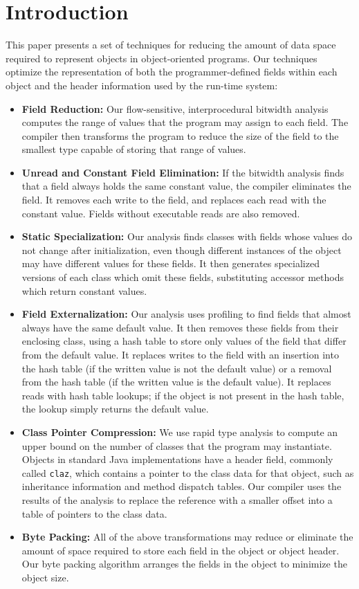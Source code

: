 \documentclass{sig-alt-full}
\begin{document}
\section{Introduction}
%
This paper presents a set of techniques for reducing the
amount of data space required to represent objects
in object-oriented programs. Our techniques optimize
the representation of both the programmer-defined fields
within each object and the header information used by the
run-time system:
\begin{itemize}
\item {\bf Field Reduction:} 
Our flow-sensitive, interprocedural bitwidth analysis
computes the range of values that the program
may assign to each field. The compiler then transforms the program
to reduce the size of the field to the smallest type
capable of storing that range of values. 
\item {\bf Unread and Constant Field Elimination:} 
If the bitwidth analysis finds that a field always holds
the same constant value, the compiler eliminates the field. 
It removes each write to the field, and replaces each read
with the constant value.  Fields without executable reads are
also removed.
\item {\bf Static Specialization:} Our analysis finds 
classes with fields whose values do not change after initialization,
even though different instances of the object may
have different values for these fields. It then generates 
specialized versions of each class which omit these fields,
substituting accessor methods which return constant values.
\item {\bf Field Externalization:} Our analysis uses profiling
to find fields that almost always have the same default value. 
It then removes these fields from their enclosing class, 
using a hash table to store only values of the field that differ
from the default value. It replaces writes to the field with
an insertion into the hash table (if the written value is not the
default value) or a removal from the hash table (if the written value
is the default value). It replaces reads with hash table lookups; 
if the object is not present in the hash table, the lookup simply
returns the default value. 
\item {\bf Class Pointer Compression:} We use rapid type analysis
to compute an upper bound on the number of classes that the
program may instantiate. Objects in standard 
Java implementations have a header field, commonly called {\tt claz},
which contains a pointer
to the class data for that object,
such as inheritance information and method dispatch tables.
Our compiler uses the results of the 
analysis to replace the reference with a smaller
offset into a table of pointers to the class data. 
\item {\bf Byte Packing:} All of the above transformations may
reduce or eliminate the amount of space required to store each
field in the object or object header. Our byte packing algorithm
arranges the fields in the object to minimize the object size.
\end{itemize}
\end{document}
